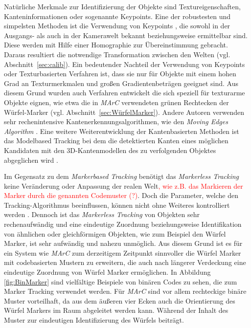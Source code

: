 Natürliche Merkmale zur Identifizierung der Objekte sind Textureigenschaften, Kanteninformationen oder sogenannte Keypoints. Eine der robustesten und simpelsten Methoden ist die Verwendung von Keypoints \cite{article:MarkerLessBarandiaran2010}\cite{article:MarkerLessWagner:}\cite{article:MarkerLessComport}\cite{article:MarkerLessLowe}, die sowohl in der Ausgangs- als auch in der Kamerawelt bekannt beziehungsweise ermittelbar sind. Diese werden mit Hilfe einer Homographie zur Übereinstimmung gebracht. Daraus resultiert die notwendige Transformation zwischen den Welten (vgl. Abschnitt~\ref{sec:calib}). Ein bedeutender Nachteil der Verwendung von Keypoints oder Texturbasierten Verfahren ist, dass sie nur für Objekte mit einem hohen Grad an Texturmerkmalen und großen Gradientenbeträgen geeignet sind. Aus diesem Grund wurden auch Verfahren \cite{article:MarkerLessStrucktHinterstoisser}\cite{article:MarkerLessStrucktDamen}\cite{article:MarkerLessStrucktPark} entwickelt die sich speziell für texturarme Objekte eignen, wie etwa die in \textit{MArC} verwendeten grünen Rechtecken der Würfel-Marker (vgl. Abschnitt~\ref{sec:WürfelMarker}). Andere Autoren verwenden sehr rechenintensive Kantenerkennungsalgorithmen, wie den \textit{Moving Edges Algorithm} \cite{article:MarkerLessEdgeMarchand}. Eine weitere Weiterentwicklung der Kantenbasierten Methoden ist das Modelbased Tracking bei dem die detektierten Kanten eines möglichen Kandidaten mit den 3D-Kantenmodellen des zu verfolgenden Objektes abgeglichen wird \cite{article:MarkerLessModellVacchetti}\cite{article:MarkerLessEdgeAlvarez}\cite{article:MarkerLessEdgeWu}\cite{article:MarkerLessBlasko}.

Im Gegensatz zu dem \textit{Markerbased Tracking} benötigt das \textit{Markerless Tracking} keine Veränderung oder Anpassung der realen Welt\textcolor{red}{, wie z.B. das Markieren der Marker durch die genannten Codemuster (?)}. Doch die Parameter, welche den Tracking-Algorithmus beeinflussen, können nicht ohne Weiteres kontrolliert werden \cite{article:MarkerLessBarandiaran2010}. Dennoch ist das \textit{Markerless Tracking} von Objekten sehr rechenaufwändig und eine eindeutige Zuordnung beziehungsweise Identifikation von ähnlichen oder gleichförmigen Objekten, wie zum Beispiel den Würfel Marker, ist sehr aufwändig und nahezu unmöglich. Aus diesem Grund ist es für ein System wie \textit{MArC} zum derzeitigem Zeitpunkt sinnvoller die Würfel Marker mit codebasierten Mustern zu erweitern, die auch nach längerer Verdeckung eine eindeutige Zuordnung von Würfel Marker ermöglichen. In Abbildung \ref{fig:BinMarker} sind vielfältige Beispiele von binären Codes zu sehen, die zum Marker Tracking verwendet werden. Für \textit{MArC} sind vor allem rechteckige binäre Muster vorteilhaft, da aus dem äußeren vier Ecken auch die Orientierung des Würfel Markers im Raum abgeleitet werden kann. Während der Inhalt des Muster zur eindeutigen Identifizierung des Würfels beiträgt. 

